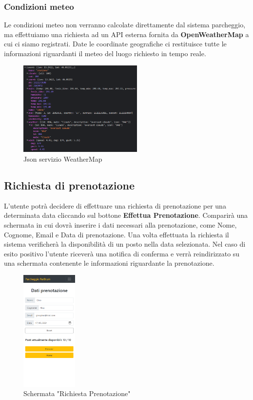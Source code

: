 \documentclass[a4paper,11pt]{report}
\begin{document}
\subsubsection{Condizioni meteo}
Le condizioni meteo non verranno calcolate direttamente dal sistema parcheggio, ma effettuiamo una richiesta ad un API esterna fornita da \textbf{OpenWeatherMap} a cui ci siamo registrati. Date le coordinate geografiche ci restituisce tutte le informazioni riguardanti il meteo del luogo richiesto in tempo reale.
\begin{figure}[H]
    \centering
    \includegraphics[width=0.55\textwidth]{weatherMap}
    \caption{Json servizio WeatherMap}
    \label{fig:jsonWeatherMap}
\end{figure}

\subsection{Richiesta di prenotazione}
L'utente potrà decidere di effettuare una richiesta di prenotazione per una determinata data cliccando sul bottone \textbf{Effettua Prenotazione}. \newline
Comparirà una schermata in cui dovrà inserire i dati necessari alla prenotazione, come Nome, Cognome, Email e Data di prenotazione. Una volta effettuata la richiesta il sistema verificherà la disponibilità di un posto nella data selezionata. Nel caso di esito positivo l'utente riceverà una notifica di conferma e verrà reindirizzato su una schermata contenente le informazioni riguardante la prenotazione.
\begin{figure}[H]
    \centering
    \includegraphics[width=0.25\textwidth]{prenotazione.png}
    \caption{Schermata "Richiesta Prenotazione"}
    \label{fig:richiestaPrenotazione}
\end{figure}
\end{document}
